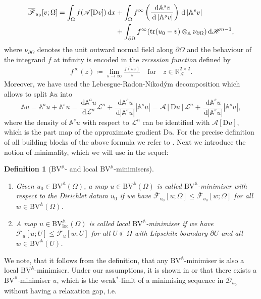 \documentclass[a4paper,10pt,reqno,oneside]{amsart}
\numberwithin{equation}{section}
\newcommand{\R}{\mathbb R}
\newcommand{\A}{\mathscr{A}}
\newcommand{\Aop}{\mathbb{A}}
\newcommand{\Leb}{\mathscr{L}}
\newcommand{\Hd}{\mathscr{H}}
\newcommand{\BV}{\mathrm{BV}}
\newcommand{\loc}{\mathrm{loc}}
\newcommand{\D}{\mathrm{D}}
\DeclareMathOperator{\tr}{tr}
\newcommand{\dx}[1]{\,\mathrm{d}#1}
\newcommand{\del}{\partial}
\newcommand{\abs}[1]{\left\lvert#1\right\rvert}
\newcommand{\F}{\mathscr{F}}
\newtheorem{defi}[thm]{Definition}
\begin{document}
\begin{align}\label{eq:Relaxation}
	\overline{\F}_{u_0}[v;\Omega] = \int_\Omega f(\A[\D v])\dx{x} 
	&+ \int_\Omega f^\infty\left(\frac{\dx{\Aop^sv}}{\dx{\abs{\Aop^sv}}}\right)\dx{\abs{\Aop^sv}}\notag \\
	&+\int_{\del\Omega} f^\infty (\tr(u_0-v)\otimes_{\Aop}\nu_{\del\Omega})\dx{\Hd^{n-1}},
\end{align}
where $\nu_{\partial\Omega}$ denotes the unit outward normal field along $\partial\Omega$ and the behaviour of the integrand $f$ at infinity is encoded in the \emph{recession function} defined by
\begin{align}\label{eq:RecessionFunction}
	f^\infty(z) \coloneqq \lim_{s\to\infty} \frac{f(sz)}{s}\quad\mbox{for}\quad z\in \R^{2\times2}_\A.
\end{align}
Moreover, we have used the Lebesgue-Radon-Nikod\'ym decomposition which allows to split $\Aop u$ into 
\begin{equation}\label{eq:LebesgueRadonNikodym_Au}
	\Aop u = \Aop^a u + \Aop^s u = \frac{\dx{\Aop^a u}}{\dx{\Leb^n}}\Leb^n + \frac{\dx{\Aop^s u}}{\dx{\abs{\Aop^s u}}}\abs{\Aop^s u} = \A[\D u] \Leb^n + \frac{\dx{\Aop^s u}}{\dx{\abs{\Aop^s u}}}\abs{\Aop^s u}, 
\end{equation}
 where the density of $\Aop^s u$ with respect to $\Leb^n$ can be identified with $\A[\D u]$, which is the part map of the approximate gradient $\D u$. 
For the precise definition of all building blocks of the above formula we refer to . Next we introduce the notion of minimality, which we will use in the sequel:
\begin{defi}[$\BV^\Aop$- and local $\BV^{\Aop}$-minimisers]\label{defi:minimiser} ~
	\begin{enumerate}
		\item Given $u_0\in \BV^{\Aop}(\Omega)$, a map $u\in \BV^\Aop(\Omega)$ is called \emph{$\BV^\Aop$-minimiser with respect to the Dirichlet datum $u_0$} if we have 
		$\overline{\F}_{u_0}[u;\Omega] \leq \overline{\F}_{u_0}[w;\Omega]$ for all $w\in \BV^{\Aop}(\Omega)$. 
		\item A map $u\in \BV^\Aop_\loc(\Omega)$ is called \emph{local $\BV^\Aop$-minimiser} if we have $\overline{\F}_u[u; U] \leq \overline{\F}_u[w;U]$ for all $U\Subset \Omega$ with Lipschitz boundary $\del U$ and all $w\in \BV^{\Aop}(U)$.
	\end{enumerate}
\end{defi}
We note, that it follows from the definition, that any $\BV^\Aop$-minimiser is also a local $\BV^\Aop$-minimiser. Under our assumptions, it is shown in \cite[Thm. 5.3]{Gmeineder} or \cite[Thm. 3.3]{Piotr} that there exists a $\BV^\Aop$-minimiser $u$, which is the weak${}^\ast$-limit of a minimising sequence in $\mathscr{D}_{u_0}$ without having a relaxation gap, i.e.
\end{document}
